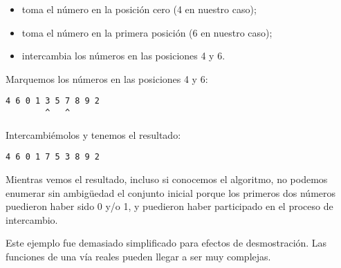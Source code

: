 \begin{itemize}
\item toma el n\'umero en la posici\'on cero (4 en nuestro caso);
\item toma el n\'umero en la primera posici\'on (6 en nuestro caso);
\item intercambia los n\'umeros en las posiciones 4 y 6.
\end{itemize}

Marquemos los n\'umeros en las posiciones 4 y 6:

\begin{lstlisting}
4 6 0 1 3 5 7 8 9 2
        ^   ^
\end{lstlisting}

Intercambi\'emolos y tenemos el resultado:

\begin{lstlisting}
4 6 0 1 7 5 3 8 9 2
\end{lstlisting}

Mientras vemos el resultado, incluso si conocemos el algoritmo, no podemos enumerar sin ambig\"uedad el conjunto inicial
porque los primeros dos n\'umeros puedieron haber sido 0 y/o 1, y puedieron haber participado en el proceso de intercambio.

Este ejemplo fue demasiado simplificado para efectos de desmostraci\'on. Las funciones de una v\'ia reales pueden llegar a ser muy complejas.
\fi %


